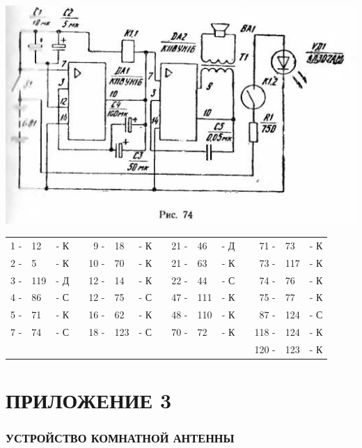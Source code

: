 \documentclass[12pt]{article}
\begin{document}
\includegraphics[scale=1, angle=0]{ekon3_075_1}

\vspace{1.5cm}

\hrulefill

\begin{tabular}{r l r p{0.5cm} r l r p{0.5cm} r l r p{0.5cm} r l r}
 1 - &  12 & - К &   &  9 - &  18 & - К &   &  21 - &  46 & - Д &   &  71 - &  73  & - К\\
 2 - &   5 & - К &   & 10 - &  70 & - К &   &  21 - &  63 & - К &   &  73 - & 117  & - К\\
 3 - & 119 & - Д &   & 12 - &  14 & - К &   &  22 - &  44 & - С &   &  74 - &  76  & - К\\
 4 - &  86 & - С &   & 12 - &  75 & - С &   &  47 - & 111 & - К &   &  75 - &  77  & - К\\
 5 - &  71 & - К &   & 16 - &  62 & - К &   &  48 - & 110 & - К &   &  87 - & 124  & - С\\
 7 - &  74 & - С &   & 18 - & 123 & - С &   &  70 - &  72 & - К &   & 118 - & 124  & - К\\
     &     &     &   &      &     &     &   &       &     &     &   & 120 - & 123  & - К\\
\end{tabular}

\hrulefill

\part{ПРИЛОЖЕНИЕ 3}

\section{УСТРОЙСТВО КОМНАТНОЙ АНТЕННЫ}
\end{document}
